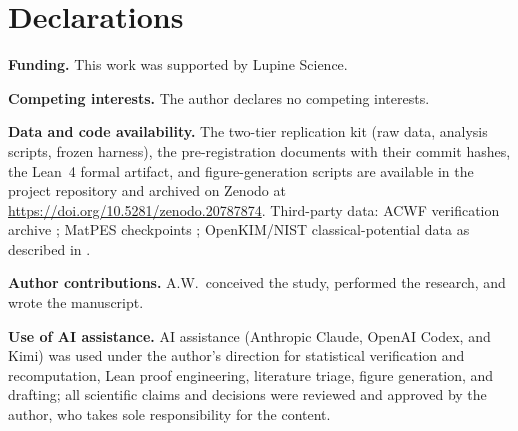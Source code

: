 \documentclass[11pt]{article}
\theoremstyle{remark}
\begin{document}
\section*{Declarations}

\textbf{Funding.} This work was supported by Lupine Science.

\textbf{Competing interests.} The author declares no competing interests.

\textbf{Data and code availability.} The two-tier replication kit (raw data,
analysis scripts, frozen harness), the pre-registration documents with their
commit hashes, the Lean~4 formal artifact, and figure-generation scripts are
available in the project repository and archived on Zenodo at
\url{https://doi.org/10.5281/zenodo.20787874}. Third-party data: ACWF verification archive \citep{bosoni2024};
MatPES checkpoints \citep{kaplan2025}; OpenKIM/NIST classical-potential data
as described in \citep{welcing2026instance}.

\textbf{Author contributions.} A.W.\ conceived the study, performed the
research, and wrote the manuscript.

\textbf{Use of AI assistance.} AI assistance (Anthropic Claude, OpenAI Codex, and Kimi) was used
under the author's direction for statistical verification and recomputation,
Lean proof engineering, literature triage, figure generation, and drafting;
all scientific claims and decisions were reviewed and approved by the author,
who takes sole responsibility for the content.



\end{document}
